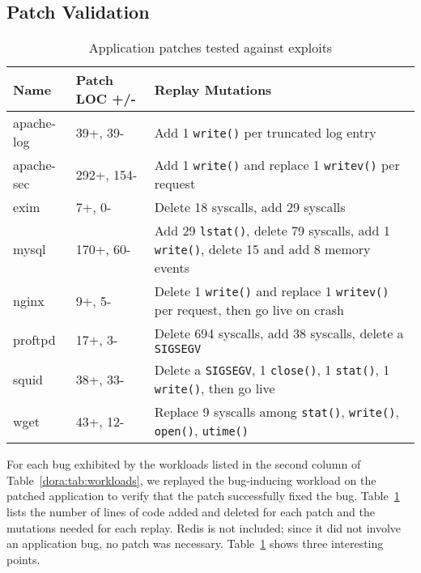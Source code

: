 \subsection{Patch Validation}
\label{dora:sec:validation}


\begin{table}[t]
  \begin{tabular}{|l|l|p{10cm}|}   \hline
{\bf Name}     & {\bf Patch LOC +/-} & {\bf Replay Mutations}                                                                           \\ \hline
		apache-log & 39+, 39-            & Add 1 {\tt write()} per truncated log entry                                                      \\ \hline
		apache-sec & 292+, 154-          & Add 1 {\tt write()} and replace 1 {\tt writev()} per request                                     \\ \hline
		exim       & 7+, 0-              & Delete 18 syscalls, add 29 syscalls                                                              \\ \hline
		mysql      & 170+, 60-           & Add 29 {\tt lstat()}, delete 79 syscalls, add 1 {\tt write()}, delete 15 and add 8 memory events \\ \hline
    nginx      & 9+, 5-              & Delete 1 {\tt write()} and replace 1 {\tt writev()} per request, then go live on crash           \\ \hline
		proftpd    & 17+, 3-             & Delete 694 syscalls, add 38 syscalls, delete a {\tt SIGSEGV}                                     \\ \hline
		squid      & 38+, 33-            & Delete a {\tt SIGSEGV}, 1 {\tt close()}, 1 {\tt stat()}, 1 {\tt write()}, then go live           \\ \hline
		wget       & 43+, 12-            & Replace 9 syscalls among {\tt stat()}, {\tt write()}, {\tt open()}, {\tt utime()}                \\ \hline
\end{tabular}
\caption{Application patches tested against exploits}
\label{dora:tab:exploits}
\end{table}

For each bug exhibited by the workloads listed in the second column of
Table~\ref{dora:tab:workloads}, we replayed the
bug-inducing workload on the patched application to verify
that the patch successfully fixed the bug. Table~\ref{dora:tab:exploits}
lists the number of lines of code added and deleted for each patch and the
mutations needed for each replay.
Redis is not included; since it did not involve an application bug, no
patch was necessary. Table~\ref{dora:tab:exploits} shows three interesting points.

